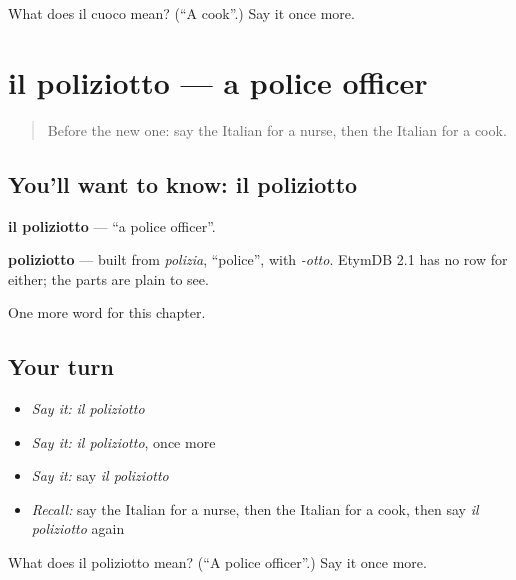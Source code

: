 \begin{tcolorbox}[breakable,colback=teal!4,colframe=teal!35!black,title={Before you move on}]
What does il cuoco mean? (\textquotedblleft{}A cook\textquotedblright{}.) Say it once more.
\end{tcolorbox}
\section[il poliziotto]{il poliziotto — a police officer}

\label{lesson:IT-C111-poliziotto}



\begin{quote}
Before the new one: say the Italian for a nurse, then the Italian for a cook.
\end{quote}

\subsection*{You'll want to know: il poliziotto}
\textbf{il poliziotto} — \textquotedblleft{}a police officer\textquotedblright{}.

\begin{cousinweb}
\textbf{poliziotto} — built from \emph{polizia}, \textquotedblleft{}police\textquotedblright{}, with \emph{-otto}. EtymDB 2.1 has no row for either; the parts are plain to see.
\end{cousinweb}

\begin{grammarlens}[title={What you've built}]
One more word for this chapter.
\end{grammarlens}

\subsection*{Your turn}
\begin{itemize}
\raggedright
  \item \emph{Say it:} \emph{il poliziotto}
  \item \emph{Say it:} \emph{il poliziotto}, once more
  \item \emph{Say it:} say \emph{il poliziotto}
  \item \emph{Recall:} say the Italian for a nurse, then the Italian for a cook, then say \emph{il poliziotto} again
\end{itemize}

\begin{tcolorbox}[breakable,colback=teal!4,colframe=teal!35!black,title={Before you move on}]
What does il poliziotto mean? (\textquotedblleft{}A police officer\textquotedblright{}.) Say it once more.
\end{tcolorbox}
